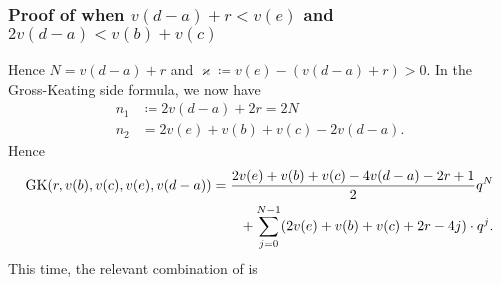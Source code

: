 \subsubsection{Proof of 
  when $v(d-a)+r < v(e)$ and $2v(d-a) < v(b)+v(c)$}
Hence $N = v(d-a) + r$ and $\varkappa \coloneqq v(e) - (v(d-a)+r) > 0$.
In the Gross-Keating side formula, we now have
\begin{align*}
  n_1 &\coloneqq 2v(d-a) + 2r = 2N \\
  n_2 &= 2v(e) + v(b) + v(c) - 2v(d-a).
\end{align*}
Hence
\begin{align*}
  \operatorname{GK}(r, v(b), v(c), v(e), v(d-a))
  &= \frac{2v(e)+v(b)+v(c)-4v(d-a)-2r+1}{2} q^{N} \\
    &\qquad+ \sum_{j=0}^{N-1} (2v(e)+v(b)+v(c)+2r-4j) \cdot q^j.
\end{align*}
This time, the relevant combination of  is
